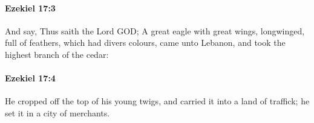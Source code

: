 		\paragraph{Ezekiel 17:3} %
			\label{EZEKIEL-17-3}

			And say, Thus saith the Lord GOD; A great eagle with great wings, longwinged, full of feathers, which had divers colours, came unto Lebanon, and took the highest branch of the cedar:


		\paragraph{Ezekiel 17:4} %
			\label{EZEKIEL-17-4}

			He cropped off the top of his young twigs, and carried it into a land of traffick; he set it in a city of merchants.


